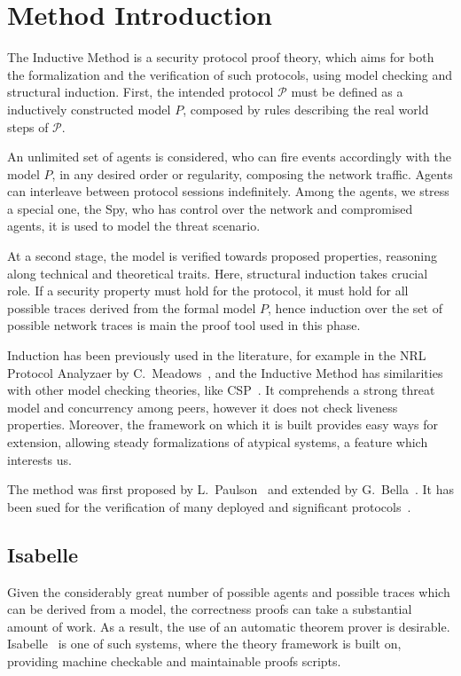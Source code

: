 \section{Method Introduction}\label{sec:inductive-method}
The Inductive Method is a security protocol proof theory, which aims for both the formalization and the verification of such protocols, using model checking and structural induction. First, the intended protocol \(\mathcal{P}\) must be defined as a inductively constructed model \(P\), composed by rules describing the real world steps of \(\mathcal{P}\).

An unlimited set of agents is considered, who can fire events accordingly with the model \(P\), in any desired order or regularity, composing the network traffic. Agents can interleave between protocol sessions indefinitely. Among the agents, we stress a special one, the Spy, who has control over the network and compromised agents, it is used to model the threat scenario.

At a second stage, the model is verified towards proposed properties, reasoning along technical and theoretical traits. Here, structural induction takes crucial role. If a security property must hold for the protocol, it must hold for all possible traces derived from the formal model \(P\), hence induction over the set of possible network traces is main the proof tool used in this phase.

Induction has been previously used in the literature, for example in the NRL Protocol Analyzaer by C.~Meadows~\cite{Meadows96}, and the Inductive Method has similarities with other model checking theories, like CSP~\cite{RyanSchneider2010}. It comprehends a strong threat model and concurrency among peers, however it does not check liveness properties. Moreover, the framework on which it is built provides easy ways for extension, allowing steady formalizations of atypical systems, a feature which interests us.

The method was first proposed by L.~Paulson~\cite{Paulson98} and extended by G.~Bella~\cite{Bella2007}. It has been sued for the verification of many deployed and significant protocols~\cite{Paulson99, BellaPaulson2006, Bella2003}.



\subsection{Isabelle}
Given the considerably great number of possible agents and possible traces which can be derived from a model, the correctness proofs can take a substantial amount of work. As a result, the use of an automatic theorem prover is desirable. Isabelle~\cite{isabelle} is one of such systems, where the theory framework is built on, providing machine checkable and maintainable proofs scripts.

